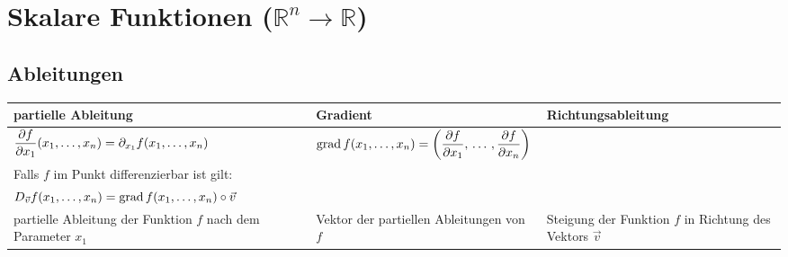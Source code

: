 \section{Skalare Funktionen ($\mathbb{R}^n \rightarrow \mathbb{R}$)
}

\subsection{Ableitungen}
\begin{tabular}{|l|l|l|}
\hline
\textbf{partielle Ableitung} & \textbf{Gradient} & \textbf{Richtungsableitung}\\
\hline
\begin{minipage}{5.5cm}
	\vspace{0.2cm}
	$\dfrac{\partial f}{\partial x_1}(x_1,\ldots,x_n)= \partial_{x_1} f(x_1,\ldots,x_n)$
	\vspace{0.2cm}
\end{minipage}&
\begin{minipage}{6cm}
	$\operatorname{grad} f(x_1,\ldots,x_n)= \left(\dfrac{\partial f}{\partial x_1}, \,\ldots\,,
	\dfrac{\partial f}{\partial x_n}\right)$ \end{minipage}&
\begin{minipage}{6.5cm}
	\vspace{0.1cm}
	$D_{\vec{v}}f(x_0,y_0)=\frac{d}{dt}f(x_0+tv_x, y_0+tv_y)|_{t=0}$
	\vspace{0.2cm}\\
	Falls $f$ im Punkt differenzierbar ist gilt: \\
	$D_{\vec{v}}f(x_1,\ldots,x_n)=\operatorname{grad} f(x_1,\ldots,x_n) \circ \vec{v}$
	\vspace{0.2cm}
\end{minipage}\\
\hline
\begin{minipage}{5.5cm}
	\vspace{0.2cm}
	partielle Ableitung der Funktion $f$ nach dem Parameter $x_1$
	\vspace{0.2cm}
\end{minipage}&
\begin{minipage}{5.5cm}
	Vektor der partiellen Ableitungen von $f$
\end{minipage}&
\begin{minipage}{5.5cm}
	Steigung der Funktion $f$ in Richtung des Vektors $\vec{v}$
\end{minipage}\\
\hline
\end{tabular}

